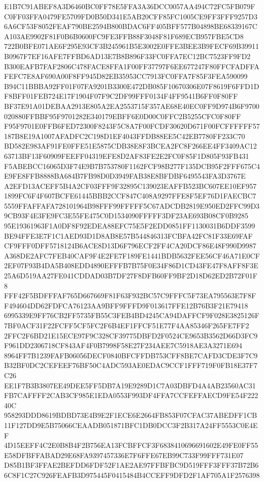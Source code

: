 \documentclass[UTF8,fontset=fandol,zihao=-4,a4paper]{ctexart}
\begin{document}
{{E1B7C91ABEF8A3D6460BC0FF78E5FFA3A36DCC0057AA494C72FC5FB079FC0FF03FFA0479FE5709FD0B50D341E5AB20CFF85FC1005CE9FF3FFF9257D3
6A6CF53F8052FEAF790BE2594B800BDAC6FF405BFF577B04898BE68339167CA103AE9902F81F0B6B0600FC9FE3FFB88F3048F81F689ECB957FBE5CD8
722B0BFE071AE6F295E93CF3B245961B5E3002E0FFE3BEE3B9FECF69B39911B0967F7EF16AFE7FFBD6AD13E7B8B896F33FC0FFA7EC12BC7523FF9FD2
B300EAFB7FAF2806C478FACE8FFA1F00FF37797F6EE677247F80FFCFADFFAFEFC7E8AF690A00F8FF945D82EB35953CC7913FC0FFA7F85F3FEA590099
B94C11BBBA92FF01F07FA9201B3300E472DB085F10670306E07F8619F6FFD1DF8BFF01FEB724E17F1904F07F9C2DF99FFF0134F4FF9541B6FF0F80FF
BF37E91A01DEBAA2913E805A2EA2553715F357AE68E40EC0FF9D974B6F9700020880FFBBF95F9701282E340179EBFF6E0D00C0FFC2B5255CFC0F80FF
F95F9701E0FFB6FED72300F8243F5C8A7F00FCDF30620D671F00FCFFFFFF57187B8E19A1007AFADFC2C198D1EF4043FFDB88EE5C42EB7780FF233C70
BD582E983AF91FE0FFE51E5875CDB38E8F3BCEA2FC8F266EE4FF3409AC1263713BF13F60909FEEFF04319EFE8D2AF83FE2E2FC0F85F1D805F93FB431
F5ABEBCC16065D3F74E9B7B753780F1162FCF98B277F135DCB95F2FFF675C4E9FE8FFB8888BA684B7FB98D0D3949FAB38E8BFDBF6495543FA3D3767E
A2EFD13ACEFF5B4A2CF03FFF9F32895C139023EAFFB523BC607EE10EF9571899FC6F4F607BCFE61445BBB2CCF847C408A9297FFE8F5EF76D1FAECBC7
5559FFAFFAFA728101964B98FFF99FFFFF5C67ADCDB2819E950ED2FFC99D39CB93F4E3FE9FC3E55FE475C0D1534090FFFFF3DF23AE693B08CF0B9285
95E19361963F1A0DF8F92EDEA88EFC75E5F2EDD0851FF1130031B6DDF3599BE94FFE3E7F1C1AED93D1D8AB8E57B544846313FCBFA42FC81F33E69FAF
CF9FFF0DFF5718124B6ACE8D13D6F796ECF2FF4CA20DCF86E48F990D9987A368DE2AFC7FEB40CAF9F4E2FE7F189FE1441BDB5632FEE56CF46A71E0CF
2EF07F93B4DA5B408EDD4890EFFFB7B75F0E34F86D1CD43FE47F8AFF8F3E25A6D519AA27FE041CDDAD03B7DF27F8DFB60FF9BF2D18D62ED2B72F01F8
FFF42F5BDFFFAF765D667669F81F63F932BC57C9FFFC5F73EA795563E7F8FF494604DD62FDFCA76123AA9BFF9FFFD9F013617FFE12B76B3F21E79418
6995339E9FF76CB2FF5735FB55C3FEB4BD4245CA94DAFFCF9F028E3825126F7BF0ACF31F22FCFF5CF5FC2F6B4EF1FFCF51E77F4AA85346F265FE7FF2
2FFC2F6BD21E15ECE97F9C328CF39775DBFD2F0524CE9653B3562D66D3FC9F961DD2306718CF843AF4F0B7998F58E27F234AEE7C5918AE3A3271E694
8964FF7B1239FAFB06056DECF0840BFCFFDB753CFF8BE7CAFD3CDE3F7C9B32BF0DC2CEFEEF76BF50C4ADC593AE0EDAC9CCF1FFF719F0FB18E37F7C26
EE1F7B3B3807EE49DEE5FF5DB7A19E9289D1C7A03DBFD4A4AB23560AC31FB7CAFFFF2CAB3CF985E1EDA0553F993DF4FFA7CCFEFFAECD9FE54F22240C
958293DDD8619BDBD73E4B9E2F1ECE6E2664FB853F07CFAC37ABEDFF1CB11F127DD9E5B75066CEAADB051871BFC1DB0DCC3F2B317A24FF5553C0E4EF
4D15EEFF4C2E0B8B4F2B756EA13FCBFFCF3F6838410696691602E49FE0FF55E58DFBFFABAD29E68FA9397457336E7F6FFE67EB99C733F99FFF731E07
D85B1BF3FFAE2BEFDD6FDF52F1AE2AE97FFBFBC9D519FFF3FFF37B72B66C8F1C27C926FEAFB3D975445F0415484B4CCEFF9DFD2F1AF705A1F2576398
}}
\end{document}
